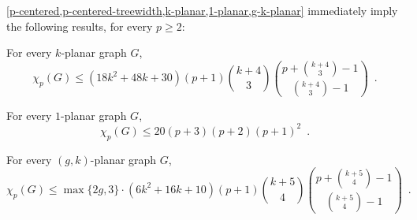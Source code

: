 \documentclass{patmorin}
\newcommand{\note}[2]{{\color{red}[#1:~#2]}}
\renewcommand{\ge}{\geqslant}
\renewcommand{\le}{\leqslant}
\renewcommand{\leq}{\leqslant}
\newcommand{\treewidth}{\ensuremath{\binom{k+4}{3}}-1}
\begin{document}
\cref{p-centered,p-centered-treewidth,k-planar,1-planar,g-k-planar} immediately imply the following results, for every $p\ge 2$:

\begin{cor}
\label{pck}
For every $k$-planar graph $G$, 
\[ \chi_p(G)\le (18k^2+48k+30)(p+1) \binom{k+4}{3} \binom{p+ \binom{k+4}{3}-1}{ \binom{k+4}{3}-1}\enspace. \]
\end{cor}

\begin{cor}
\label{pc1}
For every $1$-planar graph $G$, 
\[ \chi_p(G)\le 20 (p+3)(p+2)(p+1)^2\enspace. \]
\end{cor}


\begin{cor}
\label{pcgk}
For every $(g,k)$-planar graph $G$,  
\[ \chi_p(G) \le \max\{2g,3\}\cdot(6k^2+16k+10) (p+1) \binom{k+5}{4}\binom{p+\binom{k+5}{4}-1}{\binom{k+5}{4}-1}\enspace. \]
\end{cor}

\end{document}
